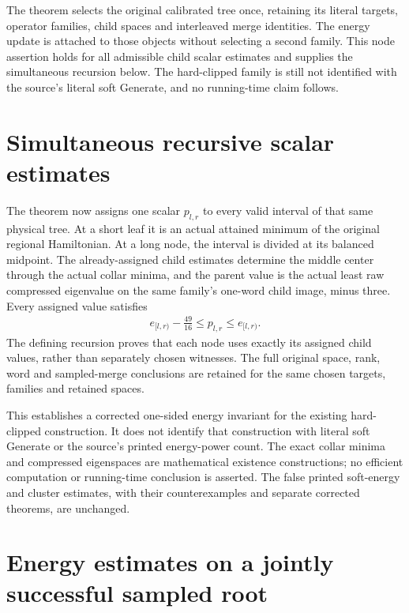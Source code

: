 \documentclass{article}
\begin{document}
The theorem
selects the original calibrated tree once, retaining its literal targets,
operator families, child spaces and interleaved merge identities. The
energy update is attached to those objects without selecting a second
family. This node assertion holds for all admissible child scalar estimates
and supplies the simultaneous recursion below. The hard-clipped family
is still not identified with the source's literal soft Generate, and no
running-time claim follows.


\section{Simultaneous recursive scalar estimates}

The theorem
now assigns one scalar $p_{l,r}$ to every valid interval of that same
physical tree. At a short leaf it is an actual attained minimum of the
original regional Hamiltonian. At a long node, the interval is divided at
its balanced midpoint. The already-assigned child estimates determine the
middle center through the actual collar minima, and the parent value is
the actual least raw compressed eigenvalue on the same family's one-word
child image, minus three. Every assigned value satisfies
\begin{align}
 e_{[l,r)}-\frac{49}{16}\le p_{l,r}\le e_{[l,r)}.
\end{align}
The defining recursion proves that each node uses exactly its assigned
child values, rather than separately chosen witnesses. The full original
space, rank, word and sampled-merge conclusions are retained for the same
chosen targets, families and retained spaces.

This establishes a corrected one-sided energy invariant for the existing
hard-clipped construction. It does not identify that construction with
literal soft Generate or the source's printed energy-power count. The
exact collar minima and compressed eigenspaces are mathematical existence
constructions; no efficient computation or running-time conclusion is
asserted. The false printed soft-energy and cluster estimates, with their
counterexamples and separate corrected theorems, are unchanged.


\section{Energy estimates on a jointly successful sampled root}
\end{document}
